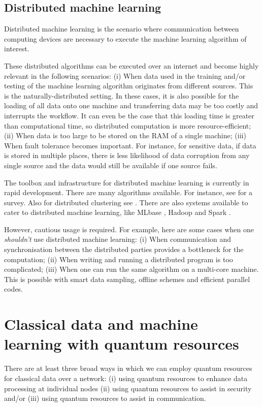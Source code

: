 \documentclass[twocolumn, aps, rmp, amsmath, amssymb, nofootinbib, superscriptaddress, longbibliography, floatfix, table-of-contents, eqsecnum]{revtex4-2}
\begin{document}
\subsection{Distributed machine learning}
Distributed machine learning is the scenario where communication between computing devices are necessary to execute the machine learning algorithm of interest.

These distributed algorithms can be executed over an internet and become highly relevant in the following scenarios: (i) When data used in the training and/or testing of the machine learning algorithm originates from different sources. This is the naturally-distributed setting. In these cases, it is also possible for the loading of all data onto one machine and transferring data may be too costly and interrupts the workflow. It can even be the case that this loading time is greater than computational time, so distributed computation is more resource-efficient; (ii) When data is too large to be stored on the RAM of a single machine; (iii) When fault tolerance becomes important. For instance, for sensitive data, if data is stored in multiple places, there is less likelihood of data corruption from any single source and the data would still be available if one source fails.

The toolbox and infrastructure for distributed machine learning is currently in rapid development. There are many algorithms available. For instance, see \cite{peteiro2013survey} for a survey. Also for distributed clustering see \cite{florian2013}. There are also systems available to cater to distributed machine learning, like MLbase \cite{MLbase}, Hadoop \cite{white2012hadoop} and Spark \cite{shanahan2015large}.

However, cautious usage is required. For example, here are some cases when one \textit{shouldn't} use distributed machine learning: (i) When communication and synchronisation between the distributed parties provides a bottleneck for the computation; (ii) When writing and running a distributed program is too complicated; (iii) When one can run the same algorithm on a multi-core machine. This is possible with smart data sampling, offline
schemes and efficient parallel codes. 

\section{Classical data and machine learning with quantum resources}
There are at least three broad ways in which we can employ quantum resources for classical data over a network: (i) using quantum resources to enhance data processing at individual nodes (ii) using quantum resources to assist in security and/or (iii) using quantum resources to assist in communication.
\end{document}
